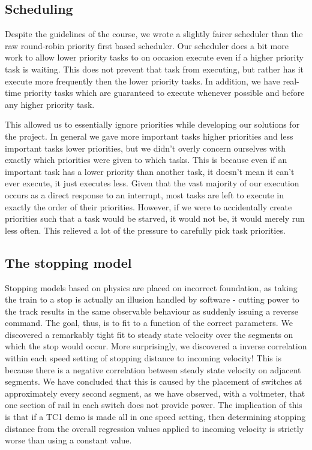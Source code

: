 \documentclass{amsart} \usepackage{amsmath} \usepackage{upgreek}
\begin{document}
\subsection*{Scheduling}

Despite the guidelines of the course, we wrote a slightly fairer scheduler than
the raw round-robin priority first based scheduler. Our scheduler does a bit
more work to allow lower priority tasks to on occasion execute even if a higher
priority task is waiting. This does not prevent that task from executing, but
rather has it execute more frequently then the lower priority tasks. In
addition, we have real-time priority tasks which are guaranteed to execute
whenever possible and before any higher priority task.

This allowed us to essentially ignore priorities while developing our solutions
for the project. In general we gave more important tasks higher priorities and
less important tasks lower priorities, but we didn't overly concern ourselves
with exactly which priorities were given to which tasks. This is because even if
an important task has a lower priority than another task, it doesn't mean it
can't ever execute, it just executes less. Given that the vast majority of our
execution occurs as a direct response to an interrupt, most tasks are left to
execute in exactly the order of their priorities. However, if we were to
accidentally create priorities such that a task would be starved, it would not
be, it would merely run less often. This relieved a lot of the pressure to
carefully pick task priorities.

\subsection*{The stopping model}

Stopping models based on physics are placed on incorrect foundation, as taking
the train to a stop is actually an illusion handled by software - cutting power
to the track results in the same observable behaviour as suddenly issuing a
reverse command. The goal, thus, is to fit to a function of the correct
parameters. We discovered a remarkably tight fit to steady state velocity over
the segments on which the stop would occur. More surprisingly, we discovered a
inverse correlation within each speed setting of stopping distance to incoming
velocity! This is because there is a negative correlation between steady state
velocity on adjacent segments. We have concluded that this is caused by the
placement of switches at approximately every second segment, as we have
observed, with a voltmeter, that one section of rail in each switch does
not provide power. The implication of this is that if a TC1 demo is made all in
one speed setting, then determining stopping distance from the overall
regression values applied to incoming velocity is strictly worse than using a
constant value.
\end{document}
